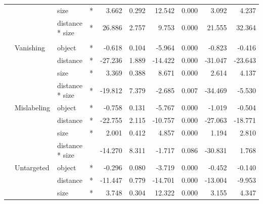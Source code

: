 \documentclass[
]{article}
\begin{document}
\begin{longtable}[t]{llllrrrrrr}
\cmidrule{3-10}\nopagebreak
\hspace{1em} &  & size & * & 3.662 & 0.292 & 12.542 & 0.000 & 3.092 & 4.237\\
\cmidrule{3-10}\nopagebreak
\hspace{1em} &  & distance * size & * & 26.886 & 2.757 & 9.753 & 0.000 & 21.555 & 32.364\\
\cmidrule{1-10}\pagebreak[0]
\addlinespace[0.3em]
\multicolumn{10}{l}{\textbf{Faster R-CNN}}\\
\hspace{1em} & Vanishing & object & * & -0.618 & 0.104 & -5.964 & 0.000 & -0.823 & -0.416\\
\cmidrule{3-10}\nopagebreak
\hspace{1em} &  & distance & * & -27.236 & 1.889 & -14.422 & 0.000 & -31.047 & -23.643\\
\cmidrule{3-10}\nopagebreak
\hspace{1em} &  & size & * & 3.369 & 0.388 & 8.671 & 0.000 & 2.614 & 4.137\\
\cmidrule{3-10}\nopagebreak
\hspace{1em} &  & distance * size & * & -19.812 & 7.379 & -2.685 & 0.007 & -34.469 & -5.530\\
\cmidrule{2-10}\nopagebreak
\hspace{1em} & Mislabeling & object & * & -0.758 & 0.131 & -5.767 & 0.000 & -1.019 & -0.504\\
\cmidrule{3-10}\nopagebreak
\hspace{1em} &  & distance & * & -22.755 & 2.115 & -10.757 & 0.000 & -27.063 & -18.771\\
\cmidrule{3-10}\nopagebreak
\hspace{1em} &  & size & * & 2.001 & 0.412 & 4.857 & 0.000 & 1.194 & 2.810\\
\cmidrule{3-10}\nopagebreak
\hspace{1em} &  & distance * size &  & -14.270 & 8.311 & -1.717 & 0.086 & -30.831 & 1.768\\
\cmidrule{2-10}\nopagebreak
\hspace{1em} & Untargeted & object & * & -0.296 & 0.080 & -3.719 & 0.000 & -0.452 & -0.140\\
\cmidrule{3-10}\nopagebreak
\hspace{1em} &  & distance & * & -11.447 & 0.779 & -14.701 & 0.000 & -13.004 & -9.953\\
\cmidrule{3-10}\nopagebreak
\hspace{1em} &  & size & * & 3.748 & 0.304 & 12.322 & 0.000 & 3.155 & 4.347\\

\end{longtable}
\end{document}
